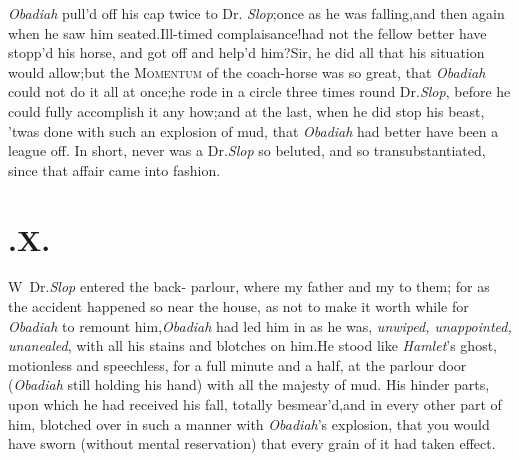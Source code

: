 \documentclass{article}
\begin{document}
\textit{Obadiah} pull’d off his cap twice to Dr.\@
\textit{Slop};\tsh once as he was falling,\tsk and then again
when he saw him seated.\tsk Ill-timed
complaisance!\tsh had not the fellow better have stopp’d his
horse, and got off and help’d him?\tsk Sir, he did all that
his situation would allow;\tsk but the\break
\textsc{Momentum} of the coach-horse was so great, that \textit{Obadiah} could not do it
all at once;\tsh he rode in a circle three times round Dr.\@ \textit{Slop},
before he could fully accomplish it any how;\tsk and at the last, when
he did stop his beast, ’twas done with such an explosion of
mud, that \textit{Obadiah} had better have been a league
off.\break
In short, never was a Dr.\@ \textit{Slop} so beluted, and so
transubstantiated, since that affair\break
came into fashion.\\
\newpage
\section{.\enspace  X.}

\lettrine{W}{\,} Dr.\@ \textit{Slop} entered the back-\break
parlour, where my father and my\break
{}\break
{}
to them; for as the accident happened so near the house, as not to make it worth while for
\textit{Obadiah} to remount him,\tsk\break \textit{Obadiah} had led
him in as he was, \textit{un\-wiped, unappointed, unanealed}, with all
his stains and blotches on him.\tsk He stood like
\textit{Hamlet}’s ghost, motionless and speechless, for a full
minute and a half, at the parlour door (\textit{Obadiah} still holding
his hand) with all the majesty of mud. His hinder parts, upon which he had
received his fall, totally besmear’d,\tsh and
in every other part of him, blotched over in such a manner with
\textit{Obadiah}’s explosion, that you would have sworn
(without mental reservation) that every grain of it had taken
effect.
\end{document}
